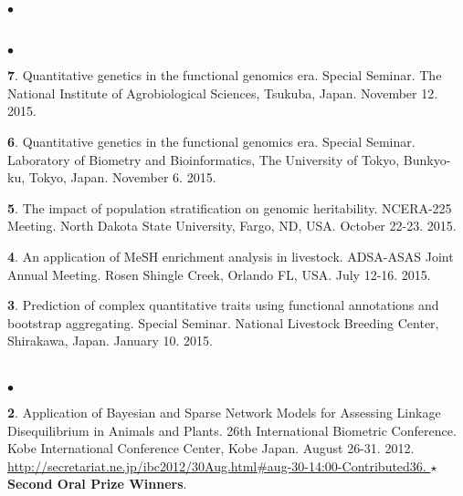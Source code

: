 \documentclass[margin,line,10pt]{res}
\newenvironment{list2}{
  \begin{list}{$\bullet$}{%
      \setlength{\itemsep}{0in}
      \setlength{\parsep}{0in} \setlength{\parskip}{0in}
      \setlength{\topsep}{0in} \setlength{\partopsep}{0in} 
      \setlength{\leftmargin}{0.2in}}}{\end{list}}
\begin{document}
\begin{resume}
\begin{list2}
\end{list2}  

    
\section{}
\begin{list2}

  \item [{\bf 7}.] Quantitative genetics in the functional genomics era. Special Seminar. The National Institute of Agrobiological Sciences, Tsukuba, Japan. November 12. 2015.

  \vspace{0.5cm}

\item [{\bf 6}.] Quantitative genetics in the functional genomics era. Special Seminar. Laboratory of Biometry and Bioinformatics, The University of Tokyo, Bunkyo-ku, Tokyo, Japan. November 6. 2015.

  \vspace{0.5cm}
  
\item [{\bf 5}.] The impact of population stratification on genomic heritability. NCERA-225 Meeting. North Dakota State University, Fargo, ND, USA. October 22-23. 2015.

  \vspace{0.5cm}

\item [{\bf 4}.] An application of MeSH enrichment analysis in livestock. ADSA-ASAS Joint Annual Meeting. Rosen Shingle Creek, Orlando FL, USA. July 12-16. 2015.

  \vspace{0.5cm}
  
\item [{\bf 3}.] Prediction of complex quantitative traits using functional annotations and bootstrap aggregating. Special Seminar. National Livestock Breeding Center, Shirakawa, Japan. January 10. 2015.
\end{list2}  

\section{}
\begin{list2}
\item  [{\bf 2}.] Application of Bayesian and Sparse Network Models for Assessing Linkage Disequilibrium in Animals and Plants. 26th International Biometric Conference. Kobe International Conference Center, Kobe Japan. August 26-31. 2012. 
  \textcolor{blue}{\href{http://secretariat.ne.jp/ibc2012/30Aug.html\#aug-30-14:00-Contributed36}{http://secretariat.ne.jp/ibc2012/30Aug.html\#aug-30-14:00-Contributed36. } }   {\bf $\star$Second Oral Prize Winners}.
\end{list2}



\end{resume}
\end{document}
